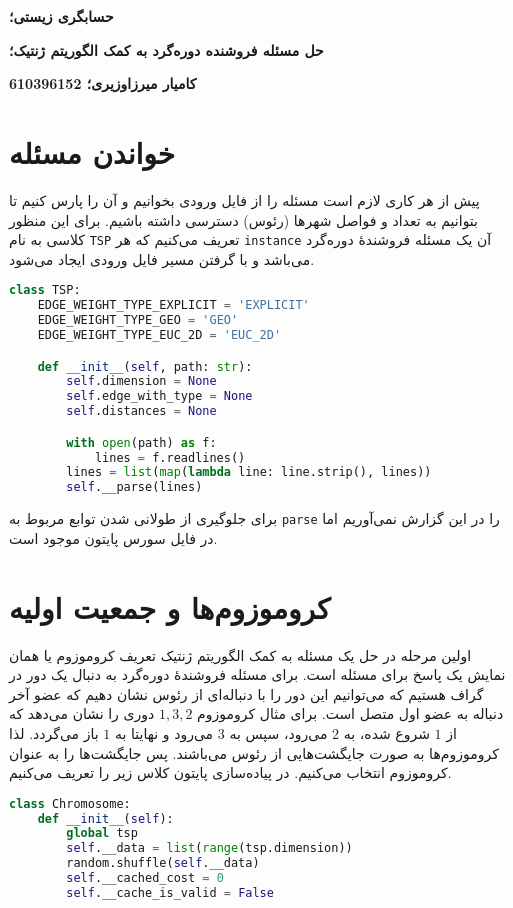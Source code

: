 \documentclass[a4paper, 12pt]{article}
\theoremstyle{definition}
\begin{document}
\textbf{حسابگری زیستی؛}

\textbf{حل مسئله فروشنده دوره‌گرد به کمک الگوریتم ژنتیک؛}

\textbf{کامیار میرزاوزیری؛ 610396152}

\hrulefill

\section{خواندن مسئله}

پیش از هر کاری لازم است مسئله را از فایل ورودی بخوانیم و آن را پارس کنیم تا بتوانیم به تعداد و فواصل شهرها (رئوس) دسترسی داشته باشیم. برای این منظور کلاسی به نام
\texttt{TSP}
تعریف می‌کنیم که هر
\texttt{instance}
آن یک مسئله فروشندهٔ دوره‌گرد می‌باشد و با گرفتن مسیر فایل ورودی ایجاد می‌شود.

\LTR
\begin{lstlisting}[language=Python]
class TSP:
    EDGE_WEIGHT_TYPE_EXPLICIT = 'EXPLICIT'
    EDGE_WEIGHT_TYPE_GEO = 'GEO'
    EDGE_WEIGHT_TYPE_EUC_2D = 'EUC_2D'

    def __init__(self, path: str):
        self.dimension = None
        self.edge_with_type = None
        self.distances = None

        with open(path) as f:
            lines = f.readlines()
        lines = list(map(lambda line: line.strip(), lines))
        self.__parse(lines)
\end{lstlisting}
\RTL

برای جلوگیری از طولانی شدن توابع مربوط به
\texttt{parse}
را در این گزارش نمی‌آوریم اما در فایل سورس پایتون موجود است.

\section{کروموزوم‌ها و جمعیت اولیه}

اولین مرحله در حل یک مسئله به کمک الگوریتم ژنتیک تعریف کروموزوم یا همان نمایش یک پاسخ برای مسئله است. برای مسئله فروشندهٔ دوره‌گرد به دنبال یک دور در گراف هستیم که می‌توانیم این دور را با دنباله‌ای از رئوس نشان دهیم که عضو آخر دنباله به عضو اول متصل است. برای مثال کروموزوم
$1, 3, 2$
دوری را نشان می‌دهد که از
$1$
شروع شده، به
$2$
می‌رود، سپس به
$3$
می‌رود و نهایتا به
$1$
باز می‌گردد. لذا کروموزوم‌ها به صورت جایگشت‌هایی از رئوس می‌باشند. پس جایگشت‌ها را به عنوان کروموزوم انتخاب می‌کنیم. در پیاده‌سازی پایتون کلاس زیر را تعریف می‌کنیم.

\LTR
\begin{lstlisting}[language=Python]
class Chromosome:
    def __init__(self):
        global tsp
        self.__data = list(range(tsp.dimension))
        random.shuffle(self.__data)
        self.__cached_cost = 0
        self.__cache_is_valid = False
\end{lstlisting}
\RTL
\end{document}

